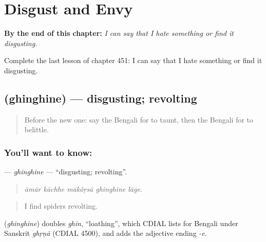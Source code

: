 
\chapter{Disgust and Envy}
\label{ch:bn-disgust-and-envy}

\begin{chapteropening}
\textbf{By the end of this chapter:} \emph{I can say that I hate something or find it disgusting.}

Complete the last lesson of chapter 451: I can say that I hate something or find it disgusting.
\end{chapteropening}

\section[\texorpdfstring{\bn{ঘিনঘিনে} (ghinghine)}{ঘিনঘিনে (ghinghine)}]{ (ghinghine) — disgusting; revolting}

\label{lesson:BN-C451-ghinghine}



\begin{quote}
Before the new one: say the Bengali for to taunt, then the Bengali for to belittle.
\end{quote}

\subsection*{You'll want to know: }
\textbf{} — \emph{ghinghine} — \textquotedblleft{}disgusting; revolting\textquotedblright{}.

\begin{quote}
    
\end{quote}

\begin{quote}
\emph{āmār kāchhe mākôṛsā ghinghine lāge.}
\end{quote}

\begin{quote}
I find spiders revolting.
\end{quote}

\begin{cousinweb}
\textbf{} (\emph{ghinghine}) doubles \emph{ghin}, \textquotedblleft{}loathing\textquotedblright{}, which CDIAL lists for Bengali under Sanskrit \emph{ghṛṇā} (CDIAL 4500), and adds the adjective ending \emph{-e}.
\end{cousinweb}

